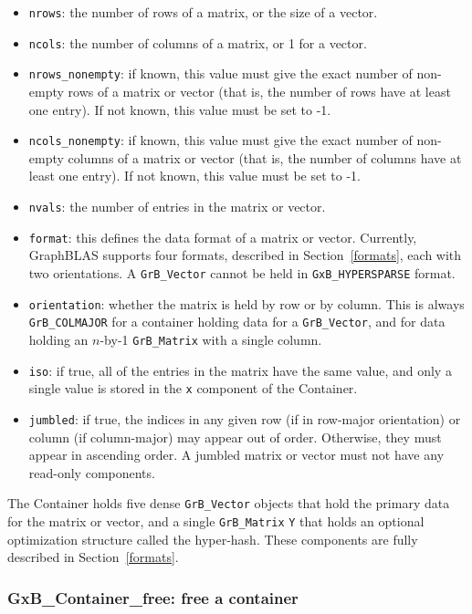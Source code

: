 \begin{itemize}
\item \verb'nrows': the number of rows of a matrix, or the size of a vector.
\item \verb'ncols': the number of columns of a matrix, or 1 for a vector. 
\item \verb'nrows_nonempty':  if known, this value must give the exact number
    of non-empty rows of a matrix or vector (that is, the number of
    rows have at least one entry).  If not known, this value must be
    set to -1.
\item \verb'ncols_nonempty':  if known, this value must give the exact number
    of non-empty columns of a matrix or vector (that is, the number of
    columns have at least one entry).  If not known, this value must be
    set to -1.
\item \verb'nvals': the number of entries in the matrix or vector.
\item \verb'format': this defines the data format of a matrix or vector.
    Currently, GraphBLAS supports four formats, described in
    Section~\ref{formats}, each with two orientations.  A \verb'GrB_Vector'
    cannot be held in \verb'GxB_HYPERSPARSE' format.
\item \verb'orientation':  whether the matrix is held by row or by column.
    This is always \verb'GrB_COLMAJOR' for a container holding data for a
    \verb'GrB_Vector', and for data holding an $n$-by-1 \verb'GrB_Matrix'
    with a single column.
\item \verb'iso': if true, all of the entries in the matrix have the same
    value, and only a single value is stored in the \verb'x' component of
    the Container.
\item \verb'jumbled': if true, the indices in any given row (if in row-major
    orientation) or column (if column-major) may appear out of order.
    Otherwise, they must appear in ascending order.
    A jumbled matrix or vector must not have any read-only components. 
\end{itemize}

The Container holds five dense \verb'GrB_Vector' objects that hold the primary
data for the matrix or vector, and a single \verb'GrB_Matrix' \verb'Y' that
holds an optional optimization structure called the hyper-hash.  These
components are fully described in Section~\ref{formats}.

\newpage
\subsubsection{{\sf GxB\_Container\_free:} free a container}
\label{container_free}

